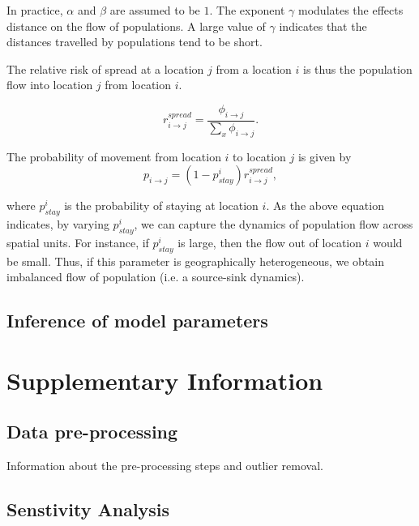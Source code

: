 \documentclass[a4paper,12pt]{article}
\begin{document}
In practice, \( \alpha \) and \( \beta \) are assumed to be $1$. The
exponent \( \gamma \) modulates the effects distance on the flow of
populations. A large value of \( \gamma \) indicates that the
distances travelled by populations tend to be short.

The relative risk of spread at a location \(j\) from a location \(i\)
is thus the population flow into location \(j\) from location \(i\).

\[
  r_{i \rightarrow j}^{spread} = \frac{\phi_{i \rightarrow
  j}}{\sum_{x}{\phi_{i \rightarrow
  j}}}.
\]

The probability of movement from location \(i\) to location \(j\) is given by
\[  p_{i \rightarrow j} = (1 - p_{stay}^i) r_{i \rightarrow j}^{spread},\]

where \(p_{stay}^i\) is the probability of staying at location
\(i\). As the above equation indicates, by varying $p_{stay}^i$, we
can capture the dynamics of population flow across spatial units. For
instance, if \(p_{stay}^i\) is large, then the flow out of location
\(i\) would be small. Thus, if this parameter is geographically
heterogeneous, we obtain imbalanced flow of population (i.e. a source-sink dynamics). 

\subsection*{Inference of model parameters}
\section*{Supplementary Information}
\subsection*{Data pre-processing}
Information about the pre-processing steps and outlier removal.
\subsection*{Senstivity Analysis}



\end{document}
